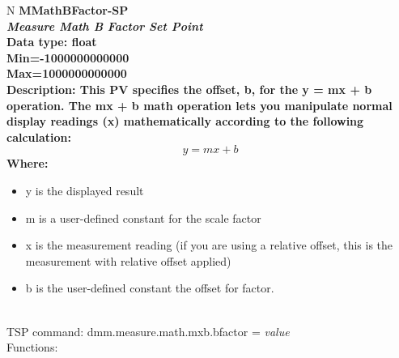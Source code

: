\documentclass[openany]{article}
\begin{document}
		\begin{tabular}{N}
			\hline
			\bfseries MMathBFactor-SP\label{pv:mmathbfactor-sp} \\ \hline
			\emph{Measure Math B Factor Set Point} \\
			Data type: float \\
			Min=-1000000000000 \\
			Max=1000000000000 \\
			Description: This PV specifies the offset, b, for the y = mx + b operation. The mx + b math operation lets you manipulate normal display readings (x) mathematically according to the following calculation: $$y = mx + b$$ Where: \begin{itemize} \item y is the displayed result \item[] m is a user-defined constant for the scale factor \item x is the measurement reading (if you are using a relative offset, this is the measurement with relative offset applied) \item b is the user-defined constant the offset for factor. \end{itemize} \\
			TSP command: dmm.measure.math.mxb.bfactor = \emph{value} \\
			Functions: \\
			\arrayrulecolor{\FuncTableBorderColor}

		\end{tabular}
\end{document}
